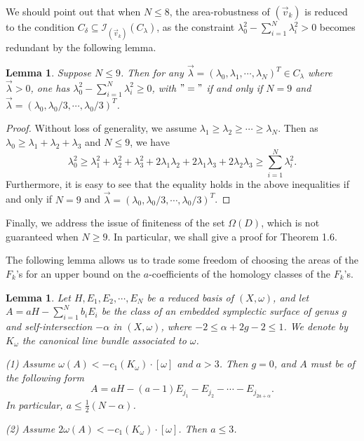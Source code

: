 \documentclass[11pt]{amsart}
\theoremstyle{plain}
\numberwithin{theorem}{section}
\newtheorem{lemma}[theorem]{Lemma}
\theoremstyle{definition}
\newcommand{\I}{{\mathcal I}}
\begin{document}
We should point out that when $N\leq 8$, the area-robustness of $(\vec{v}_k)$ is reduced to the condition
${C}_\delta\subseteq \I_{(\vec{v}_k)}(C_\lambda)$, as the constraint $\lambda_0^2-\sum_{i=1}^N\lambda_i^2>0$ becomes redundant by the following lemma.

\begin{lemma}
Suppose $N\leq 9$. Then for any $\vec{\lambda}=(\lambda_0,\lambda_1,\cdots,\lambda_N)^T\in C_\lambda$ where $\vec{\lambda}>0$, one has $\lambda_0^2-\sum_{i=1}^N \lambda_i^2\geq 0$,
with $"="$ if and only if $N=9$ and $\vec{\lambda}=(\lambda_0,\lambda_0/3, \cdots, \lambda_0/3)^T$.
\end{lemma}

\begin{proof}
Without loss of generality, we assume $\lambda_1\geq \lambda_2\geq \cdots\geq \lambda_N$. Then
as $\lambda_0\geq \lambda_1+\lambda_2+\lambda_3$ and $N\leq 9$, we have
$$
\lambda_0^2\geq \lambda_1^2+\lambda_2^2+\lambda_3^2+2\lambda_1\lambda_2+2\lambda_1\lambda_3+2\lambda_2\lambda_3\geq \sum_{i=1}^N \lambda_i^2.
$$
Furthermore, it is easy to see that the equality holds in the above inequalities if and only if $N=9$ and 
$\vec{\lambda}=(\lambda_0,\lambda_0/3, \cdots, \lambda_0/3)^T$.

\end{proof}

Finally, we address the issue of finiteness of the set $\Omega(D)$, which is not guaranteed when
$N\geq 9$. In particular, we shall give a proof for Theorem 1.6.

The following lemma allows us to trade some freedom of choosing the areas of the $F_k$'s
for an upper bound on the $a$-coefficients of the homology classes of the $F_k$'s. 

\begin{lemma}
Let $H,E_1,E_2,\cdots,E_N$ be a reduced basis of $(X,\omega)$, and let 
$A=aH-\sum_{i=1}^N b_iE_i$ be the class of an embedded symplectic surface of genus $g$ 
and self-intersection $-\alpha$ in $(X,\omega)$, where $-2\leq \alpha+2g-2\leq 1$. We denote by $K_\omega$
the canonical line bundle associated to $\omega$.

{\em(1)} Assume $\omega(A)<-c_1(K_\omega)\cdot [\omega]$ and $a>3$. Then $g=0$, and $A$ must be of the following form
$$
A=aH-(a-1)E_{j_1}-E_{j_2}-\cdots- E_{j_{2a+\alpha}}.
$$
In particular, $a\leq \frac{1}{2}(N-\alpha)$. 

{\em (2)} Assume $2\omega(A)<-c_1(K_\omega)\cdot [\omega]$. Then $a\leq 3$.
\end{lemma}
\end{document}
